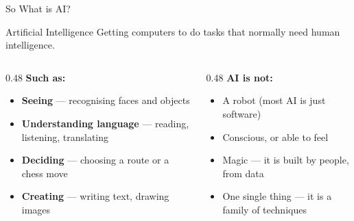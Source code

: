 \begin{frame}{So What is AI?}
    \begin{block}{Artificial Intelligence}
        Getting computers to do tasks that normally need human intelligence.
    \end{block}

    \vspace{0.8em}
    \begin{columns}[T]
        \begin{column}{0.48\textwidth}
            \textbf{Such as:}
            \begin{itemize}
                \setlength\itemsep{0.4em}
                \item \textbf{Seeing} --- recognising faces and objects
                \item \textbf{Understanding language} --- reading, listening, translating
                \item \textbf{Deciding} --- choosing a route or a chess move
                \item \textbf{Creating} --- writing text, drawing images
            \end{itemize}
        \end{column}
        \begin{column}{0.48\textwidth}
            \textbf{AI is not:}
            \begin{itemize}
                \setlength\itemsep{0.4em}
                \item A robot (most AI is just software)
                \item Conscious, or able to feel
                \item Magic --- it is built by people, from data
                \item One single thing --- it is a family of techniques
            \end{itemize}
        \end{column}
    \end{columns}
\end{frame}

